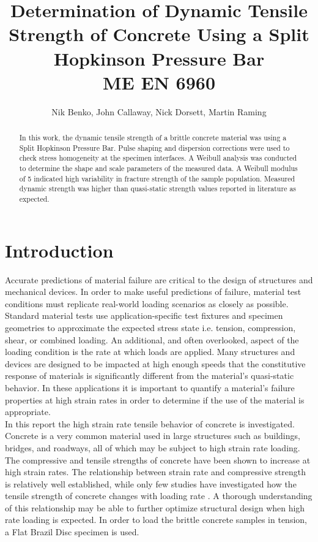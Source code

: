 \documentclass[12pt]{article}
\begin{document}
\title{ Determination of Dynamic Tensile Strength of Concrete Using a Split Hopkinson Pressure Bar  \\ \normalsize{ME EN 6960}}
\author{Nik Benko, John Callaway, Nick Dorsett, Martin Raming}
\maketitle

\begin{abstract} 
In this work, the dynamic tensile strength of a brittle concrete material was using a Split Hopkinson Pressure Bar. Pulse shaping and dispersion corrections were used to check stress homogeneity at the specimen interfaces. A Weibull analysis was conducted to determine the shape and scale parameters of the measured data. A Weibull modulus of 5 indicated high variability in fracture strength of the sample population. Measured dynamic strength was higher than quasi-static strength values reported in literature as expected. 
\end{abstract}

\section{Introduction} %
Accurate predictions of material failure are critical to the design of structures and mechanical devices. In order to make useful predictions of failure, material test conditions must replicate real-world loading scenarios as closely as possible. Standard material tests use application-specific test fixtures and specimen geometries to approximate the expected stress state i.e. tension, compression, shear, or combined loading. An additional, and often overlooked, aspect of the loading condition is the rate at which loads are applied. Many structures and devices are designed to be impacted at high enough speeds that the constitutive response of materials is significantly different from the material's quasi-static behavior. In these applications it is important to quantify a material's failure properties at high strain rates in order to determine if the use of the material is appropriate.  \\

In this report the high strain rate tensile behavior of concrete is investigated. Concrete is a very common material used in large structures such as buildings, bridges, and roadways, all of which may be subject to high strain rate loading. The compressive and tensile strengths of concrete have been shown to increase at high strain rates. The relationship between strain rate and compressive strength is relatively well established, while only few studies have investigated how the tensile strength of concrete changes with loading rate \cite{Jin2017}. A thorough understanding of this relationship may be able to further optimize structural design when high rate loading is expected. In order to load the brittle concrete samples in tension, a Flat Brazil Disc specimen is used.\\ 
\end{document}
